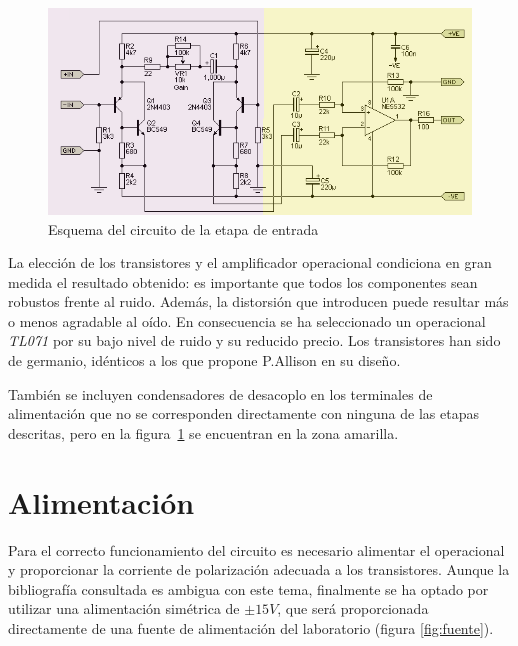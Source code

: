 \begin{figure}[!thb]
\begin{center}
\includegraphics[width=13cm]{img/circuitochop.png}
\caption{\label{fig:circuit}Esquema del circuito de la etapa de entrada}
\end{center}
\end{figure}

La elección de los transistores y el amplificador operacional condiciona en gran medida el resultado obtenido: es importante que todos los componentes sean robustos frente al ruido. Además, la distorsión que introducen puede resultar más o menos agradable al oído. En consecuencia se ha seleccionado un operacional \emph{TL071} \cite{opampdata} por su bajo nivel de ruido y su reducido precio. Los transistores han sido de germanio, idénticos a los que propone P.Allison en su diseño.

También se incluyen condensadores de desacoplo en los terminales de alimentación que no se corresponden directamente con ninguna de las etapas descritas, pero en la figura~\ref{fig:circuit} se encuentran en la zona amarilla.

\section{Alimentación}
Para el correcto funcionamiento del circuito es necesario alimentar el operacional y proporcionar la corriente de polarización adecuada a los transistores. Aunque la bibliografía consultada es ambigua con este tema, finalmente se ha optado por utilizar una alimentación simétrica de $\pm15V$, que será proporcionada directamente de una fuente de alimentación del laboratorio (figura \ref{fig:fuente}). 

